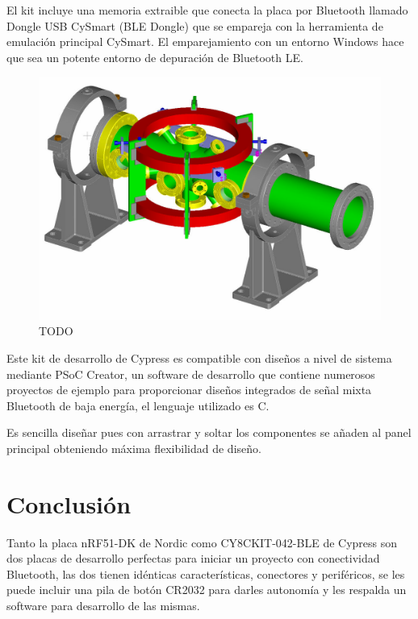 El kit incluye una memoria extraible que conecta la placa por Bluetooth llamado Dongle USB CySmart (BLE Dongle) que se empareja con la herramienta de emulación principal CySmart. El emparejamiento con un entorno Windows hace que sea un potente entorno de depuración de Bluetooth LE.

\begin{figure}[h]%
	\centering
    \includegraphics[scale=0.5]{figures/chamber.png} %

    \caption[TODO]{TODO}

   \label{figuraCypressDongle}
\end{figure}

Este kit de desarrollo de Cypress es compatible con diseños a nivel de sistema mediante PSoC Creator, un software de desarrollo que contiene numerosos proyectos de ejemplo para proporcionar diseños integrados de señal mixta Bluetooth de baja energía, el lenguaje utilizado es C.

Es sencilla diseñar pues con arrastrar y soltar los componentes se añaden al panel principal obteniendo máxima flexibilidad de diseño.

\section{Conclusión}
\label{makereference3.5}

Tanto la placa nRF51-DK de Nordic como CY8CKIT-042-BLE de Cypress son dos placas de desarrollo perfectas para iniciar un proyecto con conectividad Bluetooth, las dos tienen idénticas características, conectores y periféricos, se les puede incluir una pila de botón CR2032 para darles autonomía y les respalda un software para desarrollo de las mismas.

